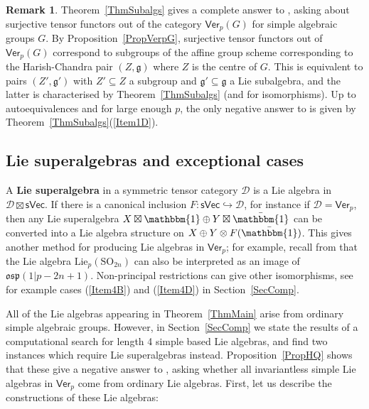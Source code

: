 \documentclass[11pt,a4paper,reqno]{amsart}
\theoremstyle{definition}
\newtheorem{remark}[theorem]{Remark}
\newcommand{\cD}{\mathcal{D}}
\numberwithin{equation}{section}
\newcommand{\Ver}{\mathsf{Ver}}
\newcommand{\unit}{{\mathbbm{1}}}
\newcommand{\fg}{\mathfrak{g}}
\newcommand{\fosp}{\mathfrak{osp}}
\newcommand{\Lie}{\mathrm{Lie}}
\newcommand{\sVec}{\mathsf{sVec}}
\newcommand{\SO}{\mathrm{SO}}
\begin{document}
\begin{remark}
Theorem~\ref{ThmSubalgs} gives a complete answer to \cite[Question~6.5]{EO}, asking about surjective tensor functors out of the category $\Ver_p(G)$ for simple algebraic groups $G$. By Proposition~\ref{PropVerpG}, surjective tensor functors out of $\Ver_p(G)$ correspond to subgroups of the affine group scheme corresponding to the Harish-Chandra pair $(Z,\fg)$ where $Z$ is the centre of $G$. This is equivalent to pairs $(Z',\fg')$ with $Z'\subseteq Z$ a subgroup and $\fg'\subseteq\fg$ a Lie subalgebra, and the latter is characterised by Theorem~\ref{ThmSubalgs} (and \cite[Proposition~4.3.2]{CEN} for isomorphisms). Up to autoequivalences and for large enough $p$, the only negative answer to \cite[Question~6.5]{EO} is given by Theorem~\ref{ThmSubalgs}(\ref{Item1D}).
\end{remark}

\subsection{Lie superalgebras and exceptional cases}\label{SecSuper} A \textbf{Lie superalgebra} in a symmetric tensor category $\cD$ is a Lie algebra in $\cD\boxtimes\sVec$. If there is a canonical inclusion $F:\sVec\hookrightarrow\cD$, for instance if $\cD=\Ver_p$, then any Lie superalgebra $X\boxtimes\unit\oplus Y\boxtimes\bar\unit$ can be converted into a Lie algebra structure on $X\oplus Y\otimes F(\bar\unit)$. This gives another method for producing Lie algebras in $\Ver_p$; for example, recall from \cite[Remark~4.3.3]{CEN} that the Lie algebra $\Lie_p(\SO_{2n})$ can also be interpreted as an image of $\fosp(1|p-2n+1)$. Non-principal restrictions can give other isomorphisms, see for example cases (\ref{Item4B}) and (\ref{Item4D}) in Section~\ref{SecComp}.

All of the Lie algebras appearing in Theorem~\ref{ThmMain} arise from ordinary simple algebraic groups. However, in Section~\ref{SecComp} we state the results of a computational search for length 4 simple based Lie algebras, and find two instances which require Lie superalgebras instead. Proposition~\ref{PropHQ} shows that these give a negative answer to \cite[Question~4.6]{asymptotic}, asking whether all invariantless simple Lie algebras in $\Ver_p$ come from ordinary Lie algebras. First, let us describe the constructions of these Lie algebras:
\end{document}
